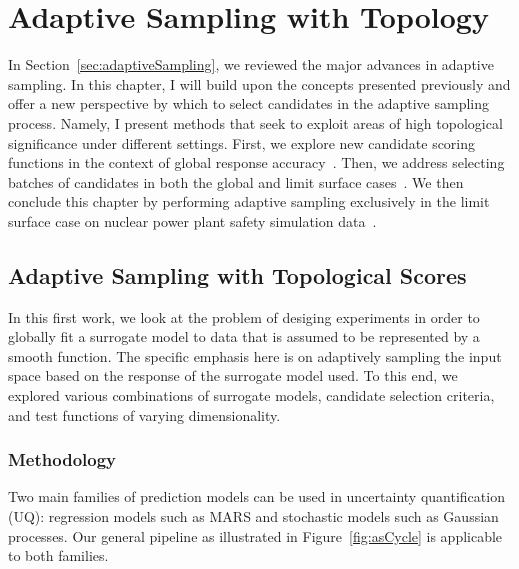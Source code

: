 
\chapter{Adaptive Sampling with Topology}
\label{ch:adaptiveSampling}

In Section~\ref{sec:adaptiveSampling}, we reviewed the major advances in adaptive sampling.
%
In this chapter, I will build upon the concepts presented previously and offer a new perspective by which to select candidates in the adaptive sampling process.
%
Namely, I present methods that seek to exploit areas of high topological significance under different settings.
%
First, we explore new candidate scoring functions in the context of global response accuracy~\cite{MaljovecWangKupresanin2013}.
%
Then, we address selecting batches of candidates in both the global and limit surface cases~\cite{MaljovecWangMoeller2014}.
%
We then conclude this chapter by performing adaptive sampling exclusively in the limit surface case on nuclear power plant safety simulation data~\cite{MaljovecWangMandelli2013b}.

\section{Adaptive Sampling with Topological Scores}
\label{paper:ijuq2013}
In this first work, we look at the problem of desiging experiments in order to globally fit a surrogate model to data that is assumed to be represented by a smooth function.
%
The specific emphasis here is on adaptively sampling the input space based on the response of the surrogate model used.
%
To this end, we explored various combinations of surrogate models, candidate selection criteria, and test functions of varying dimensionality.

\subsection{Methodology}

Two main families of prediction models can be used in uncertainty quantification (UQ): regression models such as MARS and stochastic models such as Gaussian processes.
%
Our general pipeline as illustrated in Figure~\ref{fig:asCycle} is applicable to both families.

